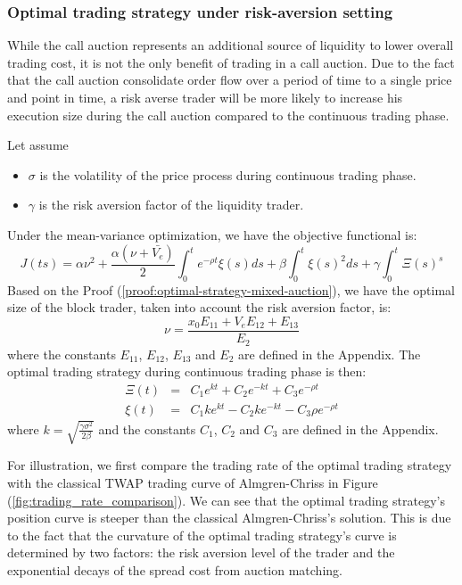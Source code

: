 {\color{red}
\subsubsection{Optimal trading strategy under risk-aversion setting}

While the call auction represents an additional source of liquidity to lower overall trading cost, it is not the only benefit of trading in a call auction. Due to the fact that the call auction consolidate order flow over a period of time to a single price and point in time, a risk averse trader will be more likely to increase his execution size during the call auction compared to the continuous trading phase.

Let assume 
\begin{itemize}
  \item $\sigma$ is the volatility of the price process during continuous trading phase.
  \item $\gamma$ is the risk aversion factor of the liquidity trader.
\end{itemize}

Under the mean-variance optimization, we have the objective functional is:
\[
  J(ts) = \alpha \nu^2 + \frac{\alpha (\nu + \bar{V_e})}{2} \int_0^t e^{-\rho t} \xi(s) ds + \beta \int_0^t \xi(s)^2 ds + \gamma \int_0^t \Xi(s)^s
\]
Based on the Proof (\ref{proof:optimal-strategy-mixed-auction}), we have the optimal size of the block trader, taken into account the risk aversion factor, is:
\[
\nu = \frac{x_0 E_{11} + V_e E_{12} + E_{13}}{E_2}
\]
where the constants $E_{11}$, $E_{12}$, $E_{13}$ and $E_2$ are defined in the Appendix. The optimal trading strategy during continuous trading phase is then:
\begin{eqnarray*}
  \Xi(t) &=& C_1 e^{k t} + C_2 e^{-k t} + C_3 e^{-\rho t} \\
  \xi(t) &=& C_1 k e^{k t} - C_2 k e^{-k t} - C_3 \rho e^{-\rho t} 
\end{eqnarray*}
where $k=\sqrt{\frac{\gamma \sigma^2}{2\beta}}$ and the constants $C_1$, $C_2$ and $C_3$ are defined in the Appendix.

For illustration, we first compare the trading rate of the optimal trading strategy with the classical TWAP trading curve of Almgren-Chriss in Figure (\ref{fig:trading_rate_comparison}). We can see that the optimal trading strategy's position curve is steeper than the classical Almgren-Chriss's solution. This is due to the fact that the curvature of the optimal trading strategy's curve is determined by two factors: the risk aversion level of the trader and the exponential decays of the spread cost from auction matching. 

}
